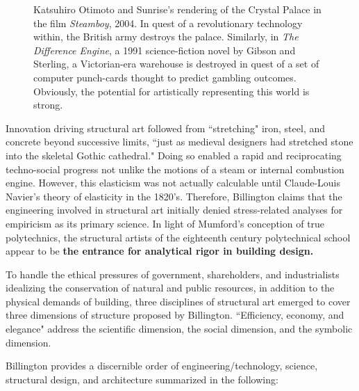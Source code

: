 \begin{figure}[h!]
\centering
{}
\caption{Katsuhiro Otimoto and Sunrise's rendering of the Crystal Palace in the film \textit{Steamboy}, 2004. In quest of a revolutionary technology within, the British army destroys the palace. Similarly, in \textit{The Difference Engine}, a 1991 science-fiction novel by Gibson and Sterling, a Victorian-era warehouse is destroyed in quest of a set of computer punch-cards thought to predict gambling outcomes. Obviously, the potential for artistically representing this world is strong.}
\end{figure}

Innovation driving structural art followed from ``stretching" iron, steel, and concrete beyond successive limits, ``just as medieval designers had stretched stone into the skeletal Gothic cathedral." \cite[p5]{TOWERANDBRIDGE} Doing so enabled a rapid and reciprocating techno-social progress not unlike the motions of a steam or internal combustion engine. However, this elasticism was not actually calculable until Claude-Louis Navier's theory of elasticity in the 1820's. \cite[p73]{RETROFITTINGMASONRY} Therefore, Billington claims that the engineering involved in structural art initially denied stress-related analyses for empiricism as its primary science. \cite[p43]{TOWERANDBRIDGE} In light of Mumford's conception of true polytechnics, the structural artists of the eighteenth century polytechnical school appear to be \textbf{the entrance for analytical rigor in building design.}


 To handle the ethical pressures of government, shareholders, and industrialists idealizing the conservation of natural and public resources, in addition to the physical demands of building, three disciplines of structural art emerged to cover three dimensions of structure proposed by Billington. ``Efficiency, economy, and elegance" address the scientific dimension, the social dimension, and the symbolic dimension. \cite[p5,16,17]{TOWERANDBRIDGE}

Billington provides a discernible order of engineering/technology, science, structural design, and architecture summarized in the following:


